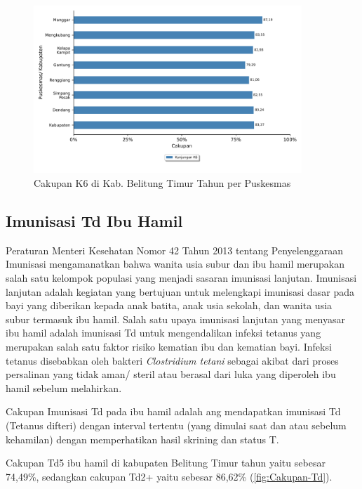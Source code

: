 \begin{figure}[H]
	\centering{}
    \includegraphics[width=0.9\textwidth]{bab_05/bab_05_03c_K6}
	\caption{Cakupan K6 di Kab. Belitung Timur Tahun \tP per Puskesmas}
	\label{fig:Cakupan-K6}
\end{figure}

\subsection{Imunisasi Td Ibu Hamil}
Peraturan Menteri Kesehatan Nomor 42 Tahun 2013 tentang Penyelenggaraan Imunisasi mengamanatkan bahwa wanita usia subur dan ibu hamil merupakan salah satu kelompok populasi yang menjadi sasaran imunisasi lanjutan.
Imunisasi lanjutan adalah kegiatan yang bertujuan untuk melengkapi imunisasi dasar pada bayi yang diberikan kepada anak batita, anak usia sekolah, dan wanita usia subur termasuk ibu hamil.
Salah satu upaya imunisasi lanjutan yang menyasar ibu hamil adalah imunisasi Td untuk mengendalikan infeksi tetanus yang merupakan salah satu faktor risiko kematian ibu dan kematian bayi.
Infeksi tetanus disebabkan oleh bakteri \emph{Clostridium tetani} sebagai akibat dari proses persalinan yang tidak aman/ steril atau berasal dari luka yang diperoleh ibu hamil sebelum melahirkan.

Cakupan Imunisasi Td pada ibu hamil adalah ang mendapatkan imunisasi Td (Tetanus difteri) dengan interval tertentu (yang dimulai saat dan atau sebelum kehamilan) dengan memperhatikan hasil skrining dan status T.

Cakupan Td5 ibu hamil di kabupaten Belitung Timur tahun \tP yaitu sebesar 74,49\%, sedangkan cakupan Td2+ yaitu sebesar 86,62\% (\autoref{fig:Cakupan-Td}).

